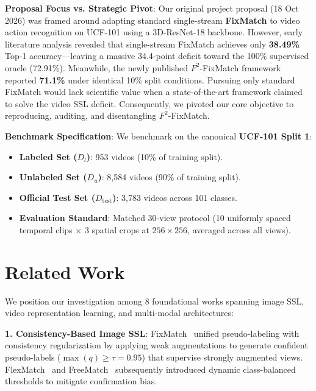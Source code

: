 \documentclass[10pt,twocolumn,a4paper]{article}
\begin{document}
\textbf{Proposal Focus vs. Strategic Pivot}:  
Our original project proposal (18 Oct 2026) was framed around adapting standard single-stream \textbf{FixMatch} to video action recognition on UCF-101 using a 3D-ResNet-18 backbone. However, early literature analysis revealed that single-stream FixMatch achieves only \textbf{38.49\%} Top-1 accuracy---leaving a massive 34.4-point deficit toward the 100\% supervised oracle (72.91\%). Meanwhile, the newly published $F^2$-FixMatch framework reported \textbf{71.1\%} under identical 10\% split conditions. Pursuing only standard FixMatch would lack scientific value when a state-of-the-art framework claimed to solve the video SSL deficit. Consequently, we pivoted our core objective to reproducing, auditing, and disentangling $F^2$-FixMatch.

\textbf{Benchmark Specification}:  
We benchmark on the canonical \textbf{UCF-101 Split 1}:
\begin{itemize}
    \item \textbf{Labeled Set ($D_l$)}: 953 videos (10\% of training split).
    \item \textbf{Unlabeled Set ($D_u$)}: 8,584 videos (90\% of training split).
    \item \textbf{Official Test Set ($D_{\text{test}}$)}: 3,783 videos across 101 classes.
    \item \textbf{Evaluation Standard}: Matched 30-view protocol (10 uniformly spaced temporal clips $\times$ 3 spatial crops at $256 \times 256$, averaged across all views).
\end{itemize}

\section{Related Work}
\label{sec:related}
We position our investigation among 8 foundational works spanning image SSL, video representation learning, and multi-modal architectures:

\textbf{1. Consistency-Based Image SSL}: FixMatch~\cite{sohn2020fixmatch} unified pseudo-labeling with consistency regularization by applying weak augmentations to generate confident pseudo-labels ($\max(q) \ge \tau = 0.95$) that supervise strongly augmented views. FlexMatch~\cite{zhang2021flexmatch} and FreeMatch~\cite{wang2023freematch} subsequently introduced dynamic class-balanced thresholds to mitigate confirmation bias.
\end{document}
